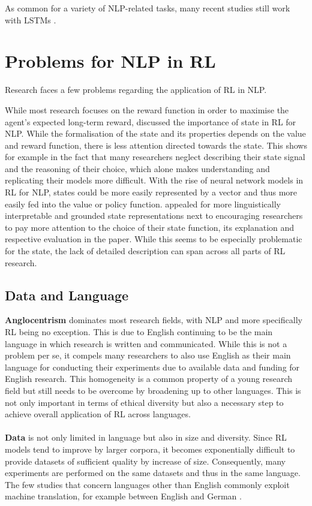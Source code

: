 \documentclass[11pt,a4paper]{article}
\begin{document}
As common for a variety of NLP-related tasks, many recent studies still work with LSTMs \citet{yasui-etal-2019, zhang-2018, li-etal-2016-deep}. 

\section{Problems for NLP in RL}
Research faces a few problems regarding the application of RL in NLP. 

While most research focuses on the reward function in order to maximise the agent's expected long-term reward, \citet{madureira2020} discussed the importance of state in RL for NLP. While the formalisation of the state and its properties depends on the value and reward function, there is less attention directed towards the state. This shows for example in the fact that many researchers neglect describing their state signal and the reasoning of their choice, which alone makes understanding and replicating their models more difficult. With the rise of neural network models in RL for NLP, states could be more easily represented by a vector and thus more easily fed into the value or policy function. \citet{madureira2020} appealed for more linguistically interpretable and grounded state representations next to encouraging researchers to pay more attention to the choice of their state function, its explanation and respective evaluation in the paper. While this seems to be especially problematic for the state, the lack of detailed description can span across all parts of RL research.

\subsection{Data and Language}
\textbf{Anglocentrism} dominates most research fields, with NLP and more specifically RL being no exception. This is due to English continuing to be the main language in which research is written and communicated. While this is not a problem per se, it compels many researchers to also use English as their main language for conducting their experiments due to available data and funding for English research. This homogeneity is a common property of a young research field but still needs to be overcome by broadening up to other languages. This is not only important in terms of ethical diversity but also a necessary step to achieve overall application of RL across languages. \\\\
\textbf{Data} is not only limited in language but also in size and diversity. Since RL models tend to improve by larger corpora, it becomes exponentially difficult to provide datasets of sufficient quality by increase of size. Consequently, many experiments are performed on the same datasets and thus in the same language. The few studies that concern languages other than English commonly exploit machine translation, for example between English and German \citet{yasui-etal-2019}.
\end{document}
